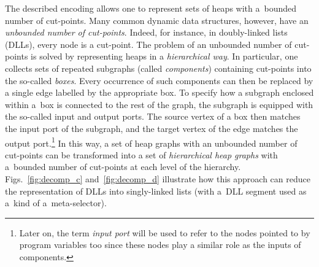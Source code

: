 The described encoding allows one to represent sets of heaps with a~bounded
number of cut-points. Many common dynamic data structures,
however, have an \emph{unbounded number of
cut-points}. Indeed, for instance, in doubly-linked lists (DLLs), every node is
a cut-point. The problem of an unbounded number of cut-points is solved by
representing heaps in a \emph{hierarchical
way}. In particular, one collects sets of repeated subgraphs (called
\emph{components}) containing cut-points into the so-called \emph{boxes}. Every
occurrence of such components can then be replaced by a single edge labelled by
the appropriate box. To specify how a subgraph enclosed within a~box is
connected to the rest of the graph, the subgraph is equipped with the so-called
input and output ports. The source vertex of a box then matches the input port
of the subgraph, and the target vertex of the edge matches the output
port.\footnote{Later on, the term \emph{input port} will be used to refer to the nodes
pointed to by program variables too since these nodes play a similar role as the
inputs of components.} In this way, a set of heap graphs with an unbounded
number of cut-points can be transformed into a set of \emph{hierarchical heap
graphs} with a~bounded number of cut-points at each level of the hierarchy.
Figs.~\ref{fig:decomp_c} and~\ref{fig:decomp_d} illustrate how this approach can
reduce the representation of DLLs into singly-linked lists (with a~DLL segment
used as a~kind of a~meta-selector). 


